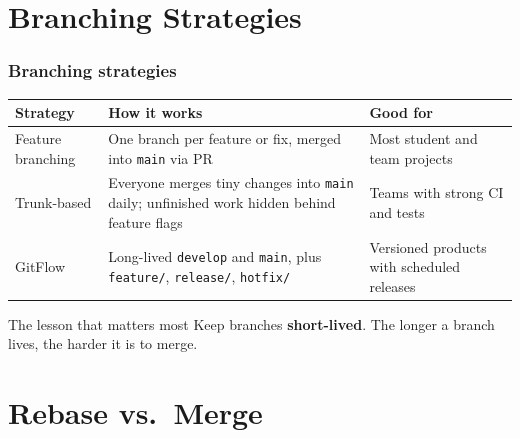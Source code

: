 \documentclass[aspectratio=169,10pt,compress]{beamer}
\begin{document}
\section[Strategies]{Branching Strategies}

\begin{frame}[t,fragile] \frametitle{Branching strategies}
  \small
  \begin{tabular}{@{}L{0.2\textwidth}L{0.44\textwidth}L{0.3\textwidth}@{}}
    \toprule
    \textbf{Strategy} & \textbf{How it works} & \textbf{Good for} \\
    \midrule
    Feature branching & One branch per feature or fix, merged into \texttt{main} via PR
      & Most student and team projects \\[4pt]
    Trunk-based & Everyone merges tiny changes into \texttt{main} daily; unfinished work hidden behind feature flags
      & Teams with strong CI and tests \\[4pt]
    GitFlow & Long-lived \texttt{develop} and \texttt{main}, plus \texttt{feature/}, \texttt{release/}, \texttt{hotfix/}
      & Versioned products with scheduled releases \\
    \bottomrule
  \end{tabular}

  \vspace{1em}
  \begin{block}{The lesson that matters most}
    Keep branches \textbf{short-lived}. The longer a branch lives, the harder it is to merge.
  \end{block}
\end{frame}

\section[Rebase]{Rebase vs.\ Merge}
\end{document}
